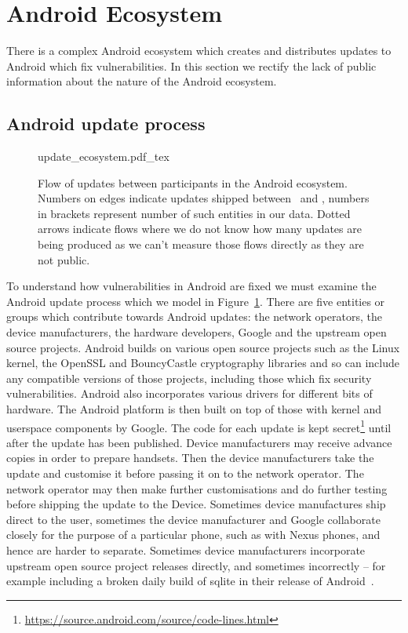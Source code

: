 \documentclass[conference,a4paper,twoside]{IEEEtran}
\let\OldTodo\todo
\renewcommand{\todo}{\OldTodo[inline]}
\newcommand{\todolater}[1]{}%
\begin{document}
\section{Android Ecosystem}\label{sec:android_ecosystem}
There is a complex Android ecosystem which creates and distributes updates to Android which fix vulnerabilities.
In this section we rectify the lack of public information about the nature of the Android ecosystem.


\subsection{Android update process}

\label{sec:android_update_process}
\begin{figure}
 \centering
 \def\svgwidth{\columnwidth}
 {update_ecosystem.pdf_tex}
 \caption{Flow of updates between participants in the Android ecosystem.
 Numbers on edges indicate updates shipped between \daStartDate\ and \daEndDate, numbers in brackets represent number of such entities in our data.
 Dotted arrows indicate flows where we do not know how many updates are being produced as we can't measure those flows directly as they are not public.\todolater{Turn into a sankey diagram}}
 \label{fig:update_ecosystem}
\end{figure}
To understand how vulnerabilities in Android are fixed we must examine the Android update process which we model in Figure~\ref{fig:update_ecosystem}.
There are five entities or groups which contribute towards Android updates: the network operators, the device manufacturers, the hardware developers, Google and the upstream open source projects.
Android builds on various open source projects such as the Linux kernel, the OpenSSL and BouncyCastle cryptography libraries and so can include any compatible versions of those projects, including those which fix security vulnerabilities.
Android also incorporates various drivers for different bits of hardware.
The Android platform is then built on top of those with kernel and userspace components by Google.
The code for each update is kept secret\footnote{\url{https://source.android.com/source/code-lines.html}}\todolater{Can we quantify this keeping the code secret? Is it worth it?} until after the update has been published.
Device manufacturers may receive advance copies in order to prepare handsets.
Then the device manufacturers take the update and customise it before passing it on to the network operator.
The network operator may then make further customisations and do further testing before shipping the update to the Device.
Sometimes device manufactures ship direct to the user, sometimes the device manufacturer and Google collaborate closely for the purpose of a particular phone, such as with Nexus phones, and hence are harder to separate.
Sometimes device manufacturers incorporate upstream open source project releases directly, and sometimes incorrectly -- for example including a broken daily build of sqlite in their release of Android~\cite{Wagner2013}.
\todolater{use statistics from samsung-updates.com -> how many binaries are there per device?}
\end{document}
